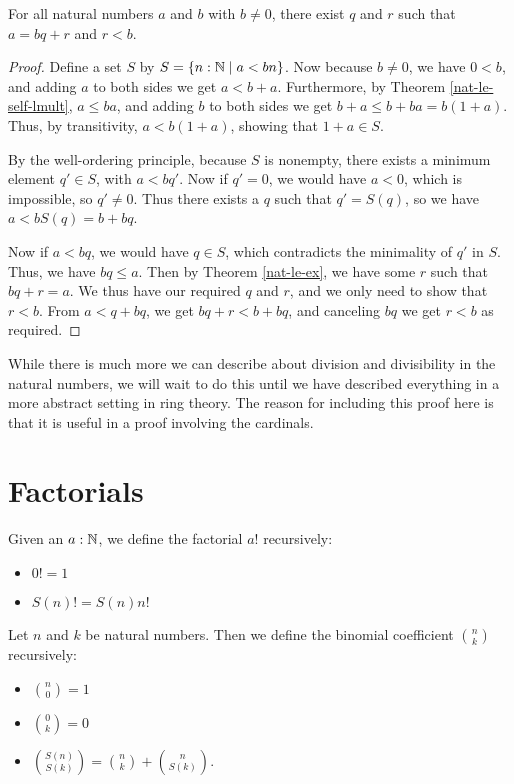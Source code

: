 \documentclass[../math.tex]{subfiles}
\begin{document}
\begin{theorem}
    For all natural numbers $a$ and $b$ with $b \neq 0$, there exist $q$ and $r$
    such that $a = bq + r$ and $r < b$.
\end{theorem}
\begin{proof}
    Define a set $S$ by $S = \{n : \mathbb{N} \mid a < bn\}$.  Now because $b \neq 0$,
    we have $0 < b$, and adding $a$ to both sides we get $a < b + a$.
    Furthermore, by Theorem \ref{nat-le-self-lmult}, $a \leq ba$, and adding $b$
    to both sides we get $b + a \leq b + ba = b(1 + a)$.  Thus, by transitivity,
    $a < b(1 + a)$, showing that $1 + a \in S$.

    By the well-ordering principle, because $S$ is nonempty, there exists a
    minimum element $q' \in S$, with $a < bq'$.  Now if $q' = 0$, we would have
    $a < 0$, which is impossible, so $q' \neq 0$.  Thus there exists a $q$ such
    that $q' = S(q)$, so we have $a < bS(q) = b + bq$.

    Now if $a < bq$, we would have $q \in S$, which contradicts the minimality
    of $q'$ in $S$.  Thus, we have $bq \leq a$.  Then by Theorem
    \ref{nat-le-ex}, we have some $r$ such that $bq + r = a$.  We thus have our
    required $q$ and $r$, and we only need to show that $r < b$.  From $a < q +
    bq$, we get $bq + r < b + bq$, and canceling $bq$ we get $r < b$ as
    required.
\end{proof}

While there is much more we can describe about division and divisibility in the
natural numbers, we will wait to do this until we have described everything in a
more abstract setting in ring theory.  The reason for including this proof here
is that it is useful in a proof involving the cardinals.

\section{Factorials}

\begin{definition}
    Given an $a : \mathbb{N}$, we define the factorial $a!$ recursively:
    \begin{itemize}
        \item $0! = 1$
        \item $S(n)! = S(n) n!$
    \end{itemize}
\end{definition}

\begin{definition}
    Let $n$ and $k$ be natural numbers.  Then we define the binomial coefficient
    $\binom{n}{k}$ recursively:
    \begin{itemize}
        \item $\displaystyle \binom{n}{0} = 1$
        \item $\displaystyle \binom{0}{k} = 0$
        \item $\displaystyle \binom{S(n)}{S(k)} = \binom{n}{k} +
            \binom{n}{S(k)}$.
    \end{itemize}
\end{definition}
\end{document}
